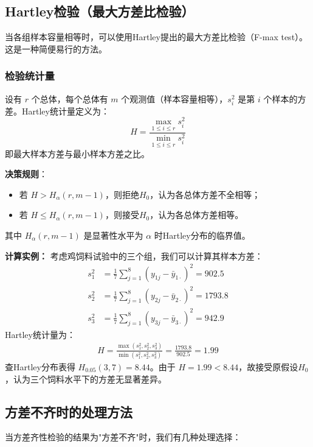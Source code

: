 \documentclass[12pt, a4paper]{amsart}
\begin{document}
\subsection{Hartley检验（最大方差比检验）}
当各组样本容量相等时，可以使用Hartley提出的最大方差比检验（F-max test）。这是一种简便易行的方法。

\subsubsection{检验统计量}
设有 $r$ 个总体，每个总体有 $m$ 个观测值（样本容量相等），$s_i^2$ 是第 $i$ 个样本的方差。Hartley统计量定义为：
\begin{equation}
H = \frac{\max_{1 \leq i \leq r} s_i^2}{\min_{1 \leq i \leq r} s_i^2}
\end{equation}
即最大样本方差与最小样本方差之比。

\textbf{决策规则}：
\begin{itemize}
    \item 若 $H > H_{\alpha}(r, m-1)$，则拒绝$H_0$，认为各总体方差不全相等；
    \item 若 $H \leq H_{\alpha}(r, m-1)$，则接受$H_0$，认为各总体方差相等。
\end{itemize}
其中 $H_{\alpha}(r, m-1)$ 是显著性水平为 $\alpha$ 时Hartley分布的临界值。

\textbf{计算实例：} 考虑鸡饲料试验中的三个组，我们可以计算其样本方差：
\begin{align*}
s_1^2 &= \frac{1}{7}\sum_{j=1}^{8}(y_{1j}-\bar{y}_{1\cdot})^2 = 902.5 \\
s_2^2 &= \frac{1}{7}\sum_{j=1}^{8}(y_{2j}-\bar{y}_{2\cdot})^2 = 1793.8 \\
s_3^2 &= \frac{1}{7}\sum_{j=1}^{8}(y_{3j}-\bar{y}_{3\cdot})^2 = 942.9
\end{align*}
Hartley统计量为：
\begin{align*}
H = \frac{\max(s_1^2, s_2^2, s_3^2)}{\min(s_1^2, s_2^2, s_3^2)} = \frac{1793.8}{902.5} = 1.99
\end{align*}
查Hartley分布表得 $H_{0.05}(3, 7) = 8.44$。由于 $H = 1.99 < 8.44$，故接受原假设$H_0$，认为三个饲料水平下的方差无显著差异。

\subsection{方差不齐时的处理方法}
当方差齐性检验的结果为"方差不齐"时，我们有几种处理选择：
\end{document}
